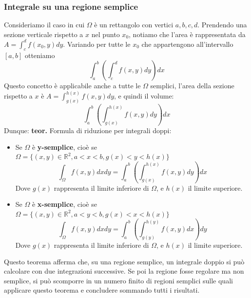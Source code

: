 \subsubsection{Integrale su una regione semplice}
Consideriamo il caso in cui $\Omega$ è un rettangolo con vertici $a, b, c, d$.\newline
Prendendo una sezione verticale rispetto a $x$ nel punto $x_0$, notiamo che l'area è rappresentata da $A = \int_{c}^{d}f(x_0, y)dy$. Variando per tutte le $x_0$ che appartengono all'intervallo $[a,b]$ otteniamo
\[
    \int_{a}^{b} \left(\int_{c}^{d}f(x,y) dy \right)dx
\]
Questo concetto è applicabile anche a tutte le $\Omega$ semplici, l'area della sezione rispetto a $x$ è $A = \int_{g(x)}^{h(x)}f(x,y)dy$, e quindi il volume:
\[
    \int_{a}^{b}\left(\int_{g(x)}^{h(x)}f(x,y) dy \right)dx
\]
Dunque:\newline
\textbf{teor.} Formula di riduzione per integrali doppi:
\begin{itemize}
    \item Se $\Omega$ è \textbf{y-semplice}, cioè se $\Omega = \{(x,y) \in \mathbb{R}^2, a< x<b, g(x)<y<h(x)\}$
    \[
        \int_{\Omega}f(x,y)dxdy = \int_{a}^{b}\left(\int_{g(x)}^{h(x)}f(x,y)dy\right)dx
    \]
    Dove $g(x)$ rappresenta il limite inferiore di $\Omega$, e $h(x)$ il limite superiore.
    \item Se $\Omega$ è \textbf{x-semplice}, cioè se $\Omega = \{(x,y) \in \mathbb{R}^2, a< y<b, g(x)<x<h(x)\}$
    \[
        \int_{\Omega}f(x,y)dxdy = \int_{a}^{b}\left(\int_{g(y)}^{h(y)}f(x,y)dx\right)dy
    \]
    Dove $g(x)$ rappresenta il limite inferiore di $\Omega$, e $h(x)$ il limite superiore.
\end{itemize}
Questo teorema afferma che, su una regione semplice, un integrale doppio si può calcolare con due integrazioni successive. Se poi la regione fosse regolare ma non semplice, si può scomporre in un numero finito di regioni semplici sulle quali applicare questo teorema e concludere sommando tutti i risultati.
